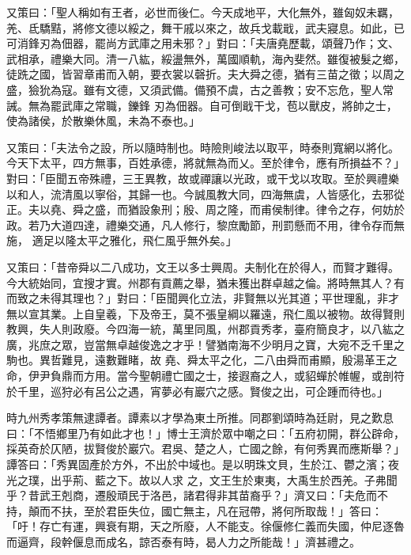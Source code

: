 \begin{pinyinscope}
 又策曰：「聖人稱如有王者，必世而後仁。今天成地平，大化無外，雖匈奴未羈，羌、氐驕黠，將修文德以綏之，舞干戚以來之，故兵戈載戢，武夫寢息。如此，已可消鋒刃為佃器，罷尚方武庫之用未邪？」對曰：「夫唐堯歷載，頌聲乃作；文、武相承，禮樂大同。清一八紘，綏盪無外，萬國順軌，海內斐然。雖復被髮之鄉，徒跣之國，皆習章甫而入朝，要衣裳以磬折。夫大舜之德，猶有三苗之徵；以周之盛，獫狁為寇。雖有文德，又須武備。備預不虞，古之善教；安不忘危，聖人常誡。無為罷武庫之常職，鑠鋒
 刃為佃器。自可倒戢干戈，苞以獸皮，將帥之士，使為諸侯，於散樂休風，未為不泰也。」



 又策曰：「夫法令之設，所以隨時制也。時險則峻法以取平，時泰則寬網以將化。今天下太平，四方無事，百姓承德，將就無為而乂。至於律令，應有所損益不？」對曰：「臣聞五帝殊禮，三王異教，故或禪讓以光政，或干戈以攻取。至於興禮樂以和人，流清風以寧俗，其歸一也。今誠風教大同，四海無虞，人皆感化，去邪從正。夫以堯、舜之盛，而猶設象刑；殷、周之隆，而甫侯制律。律令之存，何妨於政。若乃大道四達，禮樂交通，凡人修行，黎庶勵節，刑罰懸而不用，律令存而無施，
 適足以隆太平之雅化，飛仁風乎無外矣。」



 又策曰：「昔帝舜以二八成功，文王以多士興周。夫制化在於得人，而賢才難得。今大統始同，宜搜才實。州郡有貢薦之舉，猶未獲出群卓越之倫。將時無其人？有而致之未得其理也？」對曰：「臣聞興化立法，非賢無以光其道；平世理亂，非才無以宣其業。上自皇羲，下及帝王，莫不張皇綱以羅遠，飛仁風以被物。故得賢則教興，失人則政廢。今四海一統，萬里同風，州郡貢秀孝，臺府簡良才，以八紘之廣，兆庶之眾，豈當無卓越俊逸之才乎！譬猶南海不少明月之寶，大宛不乏千里之駒也。異哲難見，遠數難睹，故
 堯、舜太平之化，二八由舜而甫顯，殷湯革王之命，伊尹負鼎而方用。當今聖朝禮亡國之士，接遐裔之人，或貂蟬於帷幄，或剖符於千里，巡狩必有呂公之遇，宵夢必有巖穴之感。賢俊之出，可企踵而待也。」



 時九州秀孝策無逮譚者。譚素以才學為東土所推。同郡劉頌時為廷尉，見之歎息曰：「不悟鄉里乃有如此才也！」博士王濟於眾中嘲之曰：「五府初開，群公辟命，採英奇於仄陋，拔賢俊於巖穴。君吳、楚之人，亡國之餘，有何秀異而應斯舉？」譚答曰：「秀異固產於方外，不出於中域也。是以明珠文貝，生於江、鬱之濱；夜光之璞，出乎荊、藍之下。故以人求
 之，文王生於東夷，大禹生於西羌。子弗聞乎？昔武王剋商，遷殷頑民于洛邑，諸君得非其苗裔乎？」濟又曰：「夫危而不持，顛而不扶，至於君臣失位，國亡無主，凡在冠帶，將何所取哉！」答曰：「吁！存亡有運，興衰有期，天之所廢，人不能支。徐偃修仁義而失國，仲尼逐魯而逼齊，段幹偃息而成名，諒否泰有時，曷人力之所能哉！」濟甚禮之。




\end{pinyinscope}
